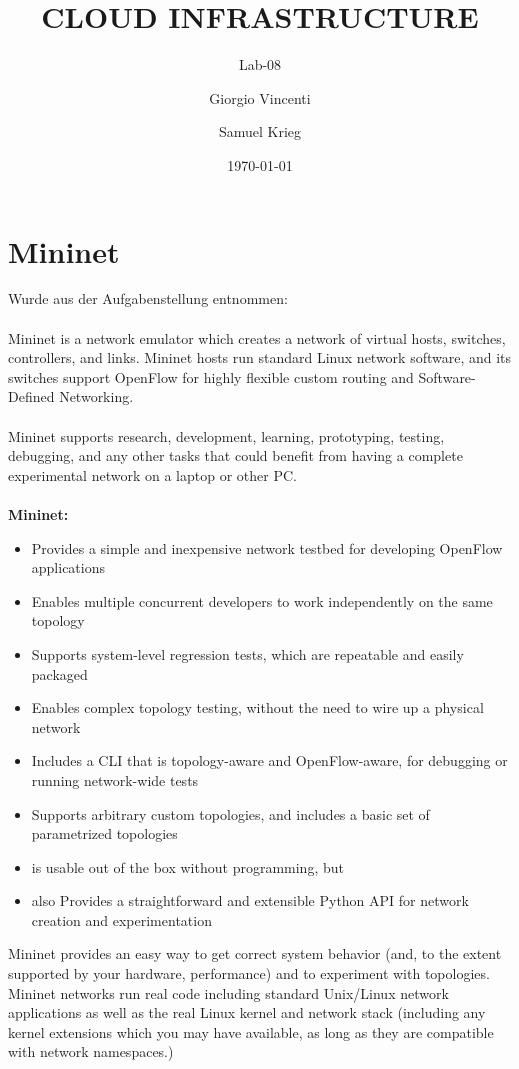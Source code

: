 \documentclass[a4,12pt]{scrartcl}
\title{CLOUD INFRASTRUCTURE}
\subtitle{Lab-08}
\author{Giorgio Vincenti \and Samuel Krieg}
\date{\today}
\begin{document}
\clearpage\maketitle
\thispagestyle{empty}
\tableofcontents
\newpage

\section{Mininet}
Wurde aus der Aufgabenstellung entnommen: \\
\\
Mininet is a network emulator which creates a network of virtual hosts, switches, controllers, and links. Mininet hosts run standard Linux network software, and its switches support OpenFlow for highly flexible custom routing and Software-Defined Networking.\\
\\
Mininet supports research, development, learning, prototyping, testing, debugging, and any other tasks that could benefit from having a complete experimental network on a laptop or other PC.\\
\\
\textbf{Mininet:}
\begin{itemize}
\item Provides a simple and inexpensive network testbed for developing OpenFlow applications
\item Enables multiple concurrent developers to work independently on the same topology
\item Supports system-level regression tests, which are repeatable and easily packaged
\item Enables complex topology testing, without the need to wire up a physical network
\item Includes a CLI that is topology-aware and OpenFlow-aware, for debugging or running network-wide tests
\item Supports arbitrary custom topologies, and includes a basic set of parametrized topologies
\item is usable out of the box without programming, but
\item also Provides a straightforward and extensible Python API for network creation and experimentation
\end{itemize}

\noindent Mininet provides an easy way to get correct system behavior (and, to the extent supported by your hardware, performance) and to experiment with topologies.
Mininet networks run real code including standard Unix/Linux network applications as well as the real Linux kernel and network stack (including any kernel extensions which you may have available, as long as they are compatible with network namespaces.)
\end{document}
